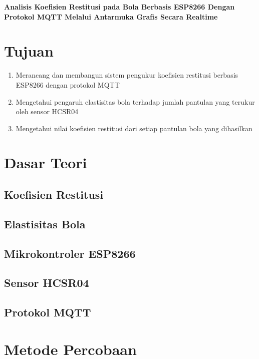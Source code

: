 \documentclass[a4paper, 12pt]{article}
\begin{document}
\begin{center}
    \textcolor[rgb]{0.176, 0.455, 0.710}{%
        \huge \textbf{%
            Analisis Koefisien Restitusi pada Bola Berbasis ESP8266 Dengan Protokol MQTT Melalui Antarmuka Grafis Secara Realtime
        }%
    }
\end{center}

\section{Tujuan}
\begin{enumerate}
    \item Merancang dan membangun sistem pengukur koefisien restitusi berbasis ESP8266 dengan protokol MQTT
    \item Mengetahui pengaruh elastisitas bola terhadap jumlah pantulan yang terukur oleh sensor HCSR04
    \item Mengetahui nilai koefisien restitusi dari setiap pantulan bola yang dihasilkan
\end{enumerate}

\section{Dasar Teori}
\subsection{Koefisien Restitusi}
\subsection{Elastisitas Bola}
\subsection{Mikrokontroler ESP8266}
\subsection{Sensor HCSR04}
\subsection{Protokol MQTT}

\section{Metode Percobaan}
\end{document}
